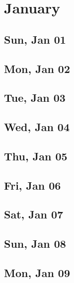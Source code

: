 \chapter{January}
	\section{Sun, Jan 01}
		
	\section{Mon, Jan 02}
		
	\section{Tue, Jan 03}
		
	\section{Wed, Jan 04}
		
	\section{Thu, Jan 05}
		
	\section{Fri, Jan 06}
		
	\section{Sat, Jan 07}
		
	\section{Sun, Jan 08}
		
	\section{Mon, Jan 09}
		
